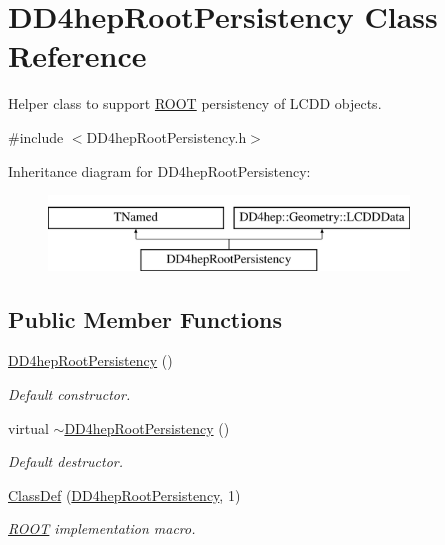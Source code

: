\hypertarget{class_d_d4hep_root_persistency}{}\section{D\+D4hep\+Root\+Persistency Class Reference}
\label{class_d_d4hep_root_persistency}


Helper class to support \hyperlink{namespace_r_o_o_t}{R\+O\+OT} persistency of L\+C\+DD objects.  




{\ttfamily \#include $<$D\+D4hep\+Root\+Persistency.\+h$>$}

Inheritance diagram for D\+D4hep\+Root\+Persistency\+:\begin{figure}[H]
\begin{center}
\leavevmode
\includegraphics[height=2.000000cm]{class_d_d4hep_root_persistency}
\end{center}
\end{figure}
\subsection*{Public Member Functions}
\begin{DoxyCompactItemize}
\item 
\hyperlink{class_d_d4hep_root_persistency_ac24a71ad3ca37110b7cb0b4f36abc300}{D\+D4hep\+Root\+Persistency} ()
\begin{DoxyCompactList}\small\item\em Default constructor. \end{DoxyCompactList}\item 
virtual \hyperlink{class_d_d4hep_root_persistency_a3abaa5bb63ce254a41b17df3d78fc005}{$\sim$\+D\+D4hep\+Root\+Persistency} ()
\begin{DoxyCompactList}\small\item\em Default destructor. \end{DoxyCompactList}\item 
\hyperlink{class_d_d4hep_root_persistency_af47b83fcc3468d2e8fca243d2cac8758}{Class\+Def} (\hyperlink{class_d_d4hep_root_persistency}{D\+D4hep\+Root\+Persistency}, 1)
\begin{DoxyCompactList}\small\item\em \hyperlink{namespace_r_o_o_t}{R\+O\+OT} implementation macro. \end{DoxyCompactList}\end{DoxyCompactItemize}
